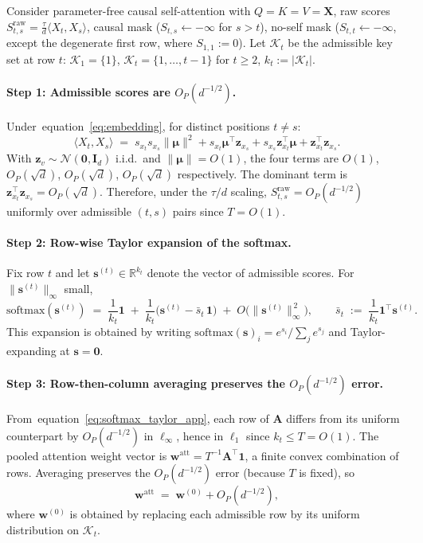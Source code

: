 \documentclass{article}
\def\eqref#1{equation~\ref{#1}}
\def\vzero{{\bm{0}}}
\def\vone{{\bm{1}}}
\def\vmu{{\bm{\mu}}}
\def\vs{{\bm{s}}}
\def\vw{{\bm{w}}}
\def\vz{{\bm{z}}}
\def\mA{{\bm{A}}}
\def\mI{{\bm{I}}}
\def\mX{{\bm{X}}}
\def\gK{{\mathcal{K}}}
\def\gN{{\mathcal{N}}}
\def\sR{{\mathbb{R}}}
\newcommand{\softmax}{\mathrm{softmax}}
\renewcommand{\softmax}{\mathrm{softmax}}
\begin{document}
Consider parameter-free causal self-attention with $Q=K=V=\mX$, raw scores $S_{t,s}^\mathrm{raw} = \frac{\tau}{d}\langle X_t, X_s\rangle$, causal mask ($S_{t,s}\leftarrow -\infty$ for $s>t$), no-self mask ($S_{t,t}\leftarrow -\infty$, except the degenerate first row, where $S_{1,1}:=0$). Let $\gK_t$ be the admissible key set at row $t$: $\gK_1=\{1\}$, $\gK_t=\{1,\ldots,t-1\}$ for $t\geq 2$, $k_t:=|\gK_t|$.

\paragraph{Step 1: Admissible scores are $O_P(d^{-1/2})$.}
Under~\eqref{eq:embedding}, for distinct positions $t\neq s$:
\[
    \langle X_t, X_s\rangle \;=\; s_{x_t}s_{x_s}\|\vmu\|^2 + s_{x_t}\vmu^\top\vz_{x_s} + s_{x_s}\vz_{x_t}^\top\vmu + \vz_{x_t}^\top\vz_{x_s}.
\]
With $\vz_v\sim\gN(\vzero,\mI_d)$ i.i.d.\ and $\|\vmu\|=O(1)$, the four terms are $O(1)$, $O_P(\sqrt d)$, $O_P(\sqrt d)$, $O_P(\sqrt d)$ respectively. The dominant term is $\vz_{x_t}^\top\vz_{x_s}=O_P(\sqrt d)$. Therefore, under the $\tau/d$ scaling, $S_{t,s}^\mathrm{raw}=O_P(d^{-1/2})$ uniformly over admissible $(t,s)$ pairs since $T=O(1)$.

\paragraph{Step 2: Row-wise Taylor expansion of the softmax.}
Fix row $t$ and let $\vs^{(t)}\in\sR^{k_t}$ denote the vector of admissible scores. For $\|\vs^{(t)}\|_\infty$ small,
\begin{equation}\label{eq:softmax_taylor_app}
    \softmax(\vs^{(t)}) \;=\; \frac{1}{k_t}\vone \;+\; \frac{1}{k_t}\Big(\vs^{(t)} - \bar{s}_t\,\vone\Big) \;+\; O\!\big(\|\vs^{(t)}\|_\infty^{\,2}\big),
    \qquad \bar s_t \;:=\; \frac{1}{k_t}\vone^\top\vs^{(t)}.
\end{equation}
This expansion is obtained by writing $\softmax(\vs)_i=e^{s_i}/\sum_j e^{s_j}$ and Taylor-expanding at $\vs=\vzero$.

\paragraph{Step 3: Row-then-column averaging preserves the $O_P(d^{-1/2})$ error.}
From~\eqref{eq:softmax_taylor_app}, each row of $\mA$ differs from its uniform counterpart by $O_P(d^{-1/2})$ in $\ell_\infty$, hence in $\ell_1$ since $k_t\le T=O(1)$. The pooled attention weight vector is $\vw^\mathrm{att}=T^{-1}\mA^\top\vone$, a finite convex combination of rows. Averaging preserves the $O_P(d^{-1/2})$ error (because $T$ is fixed), so
\[
    \vw^\mathrm{att} \;=\; \vw^{(0)} + O_P(d^{-1/2}),
\]
where $\vw^{(0)}$ is obtained by replacing each admissible row by its uniform distribution on $\gK_t$.
\end{document}
